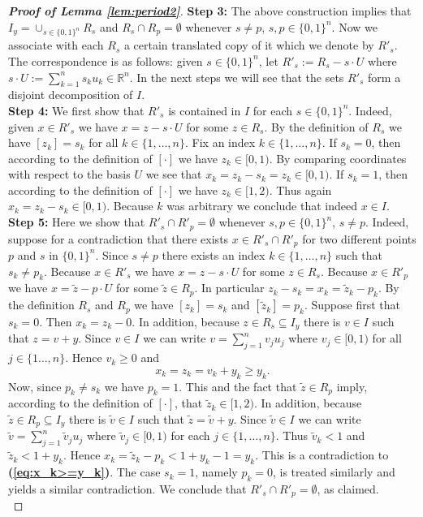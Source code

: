 \documentclass[12 pt]{amsart}
\theoremstyle{definition}
\newcommand{\R}{\mathbb{R}}
\newcommand{\bref}[1]{\textbf{\ref{#1}}} %
\newcommand{\beqref}[1]{\textbf{(\ref{#1})}} %
\begin{document}
\begin{proof}[{\bf Proof of Lemma \bref{lem:period2}}]
{\noindent \bf Step 3:} The above construction implies that $I_y=\cup_{s\in \{0,1\}^n}R_s$ and $R_s\cap R_{p}=\emptyset$ whenever $s\neq p$, $s,p\in\{0,1\}^n$. Now we associate with each $R_s$   a certain translated copy of it which we denote by $R'_s$. The correspondence is as follows: given $s\in \{0,1\}^n$, let $R'_s:=R_s-s\cdot U$ where $s\cdot U:=\sum_{k=1}^n s_k u_k\in\R^n$. In the next steps we will see that the sets $R'_s$ form a disjoint decomposition of $I$.\\

{\noindent \bf Step 4:} We first show that $R'_s$ is contained in $I$ for each $s\in\{0,1\}^n$. Indeed, given $x\in R'_s$ we have $x=z-s\cdot U$ for some $z\in R_s$. By the definition of $R_s$ we have $[z_k]=s_k$ for all $k\in\{1,\ldots,n\}$. Fix an index $k\in\{1,\ldots,n\}$. If $s_k=0$, then according to the definition of $[\cdot]$ we have $z_k\in [0,1)$. By comparing coordinates with respect to the basis $U$ we see that $x_k=z_k-s_k=z_k\in [0,1)$. If $s_k=1$, then according to the definition of $[\cdot]$ we have $z_k\in [1,2)$. Thus  again $x_k=z_k-s_k\in [0,1)$. Because $k$ was arbitrary we conclude that indeed $x\in I$. \\

{\noindent \bf Step 5:} Here we show that $R'_s\cap R'_p=\emptyset$ whenever $s,p\in\{0,1\}^n$, $s\neq p$. Indeed, suppose for a contradiction that there exists $x\in R'_s\cap R'_p$ for two different points $p$ and $s$ in $\{0,1\}^n$. Since $s\neq p$ there exists an index $k\in\{1,\ldots,n\}$ such that $s_k\neq p_k$. Because $x\in R'_s$ we have $x=z-s\cdot U$ for some $z\in R_s$. Because $x\in R'_p$ we have $x=\tilde{z}-p\cdot U$ for some $\tilde{z}\in R_p$. In particular $z_k-s_k=x_k=\tilde{z}_k-p_k$. By the definition $R_s$ and $R_p$ we have $[z_k]=s_k$ and  $[\tilde{z}_k]=p_k$. Suppose first that $s_k=0$. Then  $x_k=z_k-0$. In addition, because $z\in R_s\subseteq I_y$ there is $v\in I$ such that $z=v+y$. Since $v\in I$ we can write $v=\sum_{j=1}^n v_j u_j$ where $v_j\in [0,1)$ for all $j\in\{1\ldots,n\}$. Hence $v_k\geq 0$ and 
\begin{equation}\label{eq:x_k>=y_k}
x_k=z_k=v_k+y_k\geq y_k. 
\end{equation}
Now, since $p_k\neq s_k$ we have $p_k=1$. This and the fact that $\tilde{z}\in R_p$  imply, according to the definition of $[\cdot]$, that $\tilde{z}_k\in [1,2)$. In addition, because $\tilde{z}\in R_p\subseteq I_y$ there is $\tilde{v}\in I$ such that $\tilde{z}=\tilde{v}+y$. Since $\tilde{v}\in I$ we can write $\tilde{v}=\sum_{j=1}^n \tilde{v}_j u_j$ where $\tilde{v}_j\in [0,1)$ for each $j\in\{1,\ldots,n\}$. Thus $\tilde{v}_k<1$ and $\tilde{z}_k<1+y_k$. Hence  $x_k=\tilde{z}_k-p_k<1+y_k-1=y_k$. This is a contradiction to \beqref{eq:x_k>=y_k}. The case $s_k=1$, namely $p_k=0$, is treated similarly and yields a similar contradiction. We conclude that  $R'_s\cap R'_p=\emptyset$, as claimed. \\


\end{proof}
\end{document}
